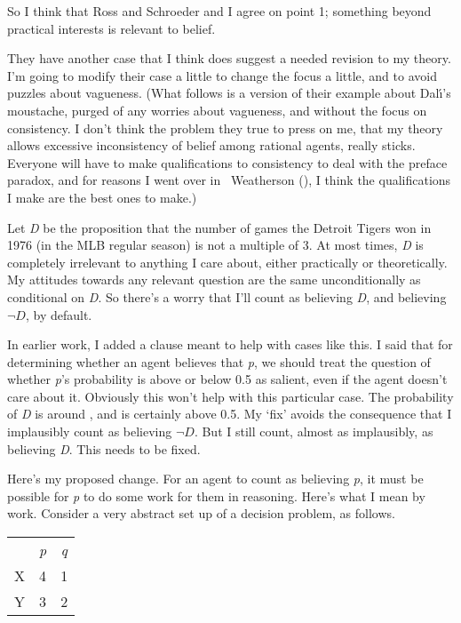 \documentclass[
  11pt,
  letterpaper,
  DIV=11,
  numbers=noendperiod,
  twoside]{scrartcl}
\begin{document}
So I think that Ross and Schroeder and I agree on point 1; something
beyond practical interests is relevant to belief.

They have another case that I think does suggest a needed revision to my
theory. I'm going to modify their case a little to change the focus a
little, and to avoid puzzles about vagueness. (What follows is a version
of their example about Dalı́'s moustache, purged of any worries about
vagueness, and without the focus on consistency. I don't think the
problem they true to press on me, that my theory allows excessive
inconsistency of belief among rational agents, really sticks. Everyone
will have to make qualifications to consistency to deal with the preface
paradox, and for reasons I went over in ~Weatherson
(), I think the qualifications
I make are the best ones to make.)

Let \emph{D} be the proposition that the number of games the Detroit
Tigers won in 1976 (in the MLB regular season) is not a multiple of 3.
At most times, \emph{D} is completely irrelevant to anything I care
about, either practically or theoretically. My attitudes towards any
relevant question are the same unconditionally as conditional on
\emph{D}. So there's a worry that I'll count as believing \emph{D}, and
believing \(\neg D\), by default.

In earlier work, I added a clause meant to help with cases like this. I
said that for determining whether an agent believes that \emph{p}, we
should treat the question of whether \emph{p}'s probability is above or
below 0.5 as salient, even if the agent doesn't care about it. Obviously
this won't help with this particular case. The probability of \emph{D}
is around , and is certainly above 0.5. My `fix' avoids the consequence
that I implausibly count as believing \(\neg D\). But I still count,
almost as implausibly, as believing \emph{D}. This needs to be fixed.

Here's my proposed change. For an agent to count as believing \emph{p},
it must be possible for \emph{p} to do some work for them in reasoning.
Here's what I mean by work. Consider a very abstract set up of a
decision problem, as follows.

\begin{longtable}[]{@{}lcc@{}}
\toprule\noalign{}
\endhead
\bottomrule\noalign{}
\endlastfoot
& \emph{p} & \emph{q} \\
X & 4 & 1 \\
Y & 3 & 2 \\
\end{longtable}
\end{document}
